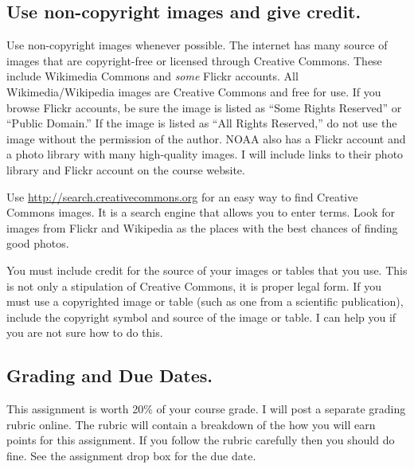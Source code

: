 \documentclass[letterpaper]{memoir}
\newcommand{\insertslide}[2]{%
  \framebox{\texttt{[image: \#2]}}
}
\begin{document}
\subsection*{Use non-copyright images and give credit.}


Use non-copyright images whenever possible. The internet has many source of images that are copyright-free or licensed through Creative Commons. These include Wikimedia Commons and \emph{some} Flickr accounts. All Wikimedia/Wikipedia images are Creative Commons and free for use. If you browse Flickr accounts, be sure the image is listed as “Some Rights Reserved” or ``Public Domain.'' If the image is listed as “All Rights Reserved,” do not use the image without the permission of the author. NOAA also has a Flickr account and a photo library with many high-quality images. I will include links to their photo library and Flickr account on the course website.

Use \url{http://search.creativecommons.org} for an easy way to find Creative Commons images. It is a search engine that allows you to enter terms. Look for images from Flickr and Wikipedia as the places with the best chances of finding good photos.

You must include credit for the source of your images or tables that you use.  This is not only a stipulation of Creative Commons, it is proper legal form. If you must use a copyrighted image or table (such as one from a scientific publication), include the copyright symbol and source of the image or table.  I can help you if you are not sure how to do this. \sidepar{\insertslide{17}{5_in_5_overview.pdf}}

\subsection*{Grading and Due Dates.}


This assignment is worth 20\% of your course grade. I will post a separate grading rubric online. The rubric will contain a breakdown of the how you will earn points for this assignment. If you follow the rubric carefully then you should do fine. See the assignment drop box for the due date. %
\end{document}
